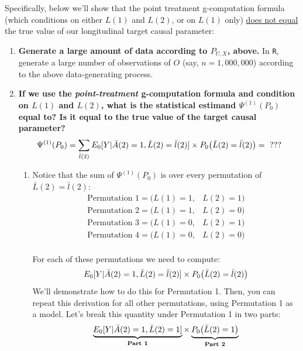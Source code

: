 \documentclass[answers]{exam}
\begin{document}
\noindent Specifically, below we'll show that the point treatment g-computation formula (which conditions on either $L(1)$ and $L(2)$, or on $L(1)$ only) \underline{does not equal} the true value of our longitudinal target causal parameter:

\vspace{2mm}

\begin{enumerate}
\item \textbf{Generate a large amount of data according to $P_{U,X}$, above.} In \texttt{R}, generate a large number of observations of $O$ (say, $n = 1,000,000$) according to the above data-generating process. 

\item \textbf{If we use the \textit{point-treatment} g-computation formula and condition on $L(1)$ and $L(2)$, what is the statistical estimand $\Psi^{(1)}(P_0)$ equal to? Is it equal to the true value of the target causal parameter?}
\[
\Psi^{(1)}(P_0) = \sum_{\bar{l}(2)}E_0[Y|\bar{A}(2) = 1, \bar{L}(2) = \bar{l}(2)] \times P_0\big{(}\bar{L}(2) = \bar{l}(2)\big{)} = \text{ ???}
\]
\begin{enumerate}
\item Notice that the sum of $\Psi^{(1)}(P_0)$ is over every permutation of $\bar{L}(2) = \bar{l}(2)$: 
\begin{align*}
\text{Permutation 1} = (L(1) = 1, &L(2) = 1) \\
\text{Permutation 2} = (L(1) = 1, &L(2) = 0) \\
\text{Permutation 3} = (L(1) = 0, &L(2) = 1) \\
\text{Permutation 4} = (L(1) = 0, &L(2) = 0) \\
\end{align*}

For each of these permutations we need to compute: 
$$E_0[Y|\bar{A}(2) = 1, \bar{L}(2) = \bar{l}(2)] \times P_0\big{(}\bar{L}(2) = \bar{l}(2)\big{)}$$ 
We'll demonstrate how to do this for Permutation 1. Then, you can repeat this derivation for all other permutations, using Permutation 1 as a model. Let's break this quantity under Permutation 1 in two parts:
$$\underbrace{E_0[Y|\bar{A}(2) = 1, \bar{L}(2) = 1]}_\text{\textbf{Part 1}} \times \underbrace{P_0\big{(}\bar{L}(2) = 1\big{)}}_\text{\textbf{Part 2}}$$



\end{enumerate}
\end{enumerate}
\end{document}
